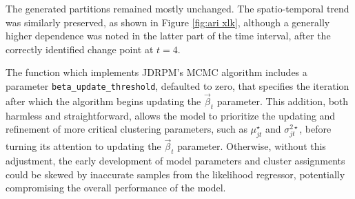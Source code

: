 \documentclass[12pt,	%
	a4paper,		%
	twoside,		%
	openright,		%
	titlepage,%
	]{book}
\theoremstyle{definition}
\newcommand{\mjline}[1]{\texttt{#1}}
\begin{document}
The generated partitions remained mostly unchanged. The spatio-temporal trend was similarly preserved, as shown in Figure \ref{fig:ari xlk}, although a generally higher dependence was noted in the latter part of the time interval, after the correctly identified change point at $t=4$.



The function which implements JDRPM's MCMC algorithm includes a parameter \mjline{beta_update_threshold}, defaulted to zero, that specifies the iteration after which the algorithm begins updating the $\vec{\beta}_t$ parameter. This addition, both harmless and straightforward, allows the model to prioritize the updating and refinement of more critical clustering parameters, such as $\mu^\star_{jt}$ and $\sigma^{2\star}_{jt}$, before turning its attention to updating the $\vec{\beta}_t$ parameter. Otherwise, without this adjustment, the early development of model parameters and cluster assignments could be skewed by inaccurate samples from the likelihood regressor, potentially compromising the overall performance of the model.
\end{document}
